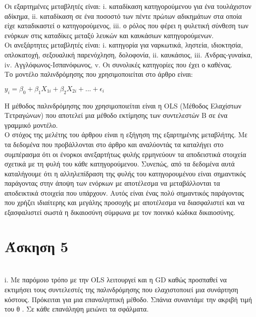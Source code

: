 \documentclass{article}
\begin{document}
	Οι εξαρτημένες μεταβλητές είναι: i. καταδίκαση κατηγορούμενου για ένα τουλάχιστον αδίκημα, ii. καταδίκαση σε ένα ποσοστό των πέντε πρώτων αδικημάτων στα οποία είχε καταδικαστεί ο κατηγορούμενος, iii. ο ρόλος που φέρει η φυλετική σύνθεση των ενόρκων στις καταδίκες μεταξύ λευκών και καυκάσιων κατηγορούμενων.\\
	
	Οι ανεξάρτητες μεταβλητές είναι: i. κατηγορία για ναρκωτικά, ληστεία, ιδιοκτησία, οπλοκατοχή, σεξουαλική παρενόχληση, δολοφονία, ii. καυκάσιος, iii. Άνδρας-γυναίκα, iv. Αγγλόφωνος-Ισπανόφωνος, v. Οι συνολικές κατηγορίες που έχει ο καθένας.\\
	
	
	Το μοντέλο παλινδρόμησης που χρησιμοποιείται στο άρθρο είναι:\\
	\begin{center}
		
		\large $y_{i} = \beta_0 + \beta_1  X_{1i} + \beta_2 X_{2i} + ... + \epsilon_{i} $
		
	\end{center}
	
	Η μέθοδος παλινδρόμησης που χρησιμοποιείται είναι η OLS (Μέθοδος Ελαχίστων Τετραγώνων) που αποτελεί μια μέθοδο εκτίμησης των συντελεστών Β σε ένα γραμμικό μοντέλο.\\
	
	Ο στόχος της μελέτης του άρθρου είναι η εξήγηση της εξαρτημένης μεταβλήτης. Με τα δεδομένα που προβάλλονται στο άρθρο και αναλύοντάς τα καταλήγει στο συμπέρασμα ότι οι ένορκοι ανεξαρτήτως φυλής ερμηνεύουν τα αποδειστικά στοιχεία σχετικά με τη φυλή του κάθε κατηγορούμενου. Συνεπώς, από τα δεδομένα αυτά καταλήγουμε ότι η αλληλεπίδραση της φυλής του κατηγορουμένου είναι σημαντικός παράγοντας στην άποψη των ενόρκων με αποτέλεσμα να μεταβάλλονται τα αποδεικτικά στοιχεία που υπάρχουν. Αυτός είναι ένας πολύ σημαντικός παράγοντας που χρήζει ιδιαίτερης και μεγάλης προσοχής με αποτέλεσμα να διασφαλιστεί και να εξασφαλιστεί σωστά η δικαιοσύνη σύμφωνα με τον ποινικό κώδικα δικαιοσύνης.\\
	
	
	\newpage
	
	\section{Άσκηση 5} \\
	
	i.  Με παρόμοιο τρόπο με την OLS λειτουργεί και η GD καθώς προσπαθεί να εκτιμήσει τους συντελεστές της παλινδρόμησης που ελαχιστοποιεί μια συνάρτηση κόστους. Πρόκειται για μια επαναληπτική μέθοδο. Σπάνια συναντάμε την ακριβή τιμή του θ . Σε κάθε επανάληψη μειώνει τα σφάλματα.\\
	
\end{document}
